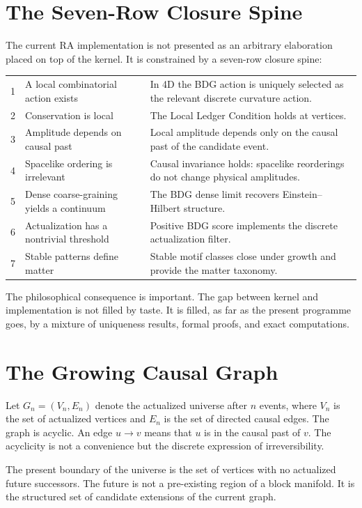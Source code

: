 \documentclass[11pt]{article}
\begin{document}
\section{The Seven-Row Closure Spine}
The current RA implementation is not presented as an arbitrary elaboration placed on top of the kernel. It is constrained by a seven-row closure spine:
\begin{center}
\begin{tabular}{p{} p{} p{}}
1 & A local combinatorial action exists & In 4D the BDG action is uniquely selected as the relevant discrete curvature action.\\
2 & Conservation is local & The Local Ledger Condition holds at vertices.\\
3 & Amplitude depends on causal past & Local amplitude depends only on the causal past of the candidate event.\\
4 & Spacelike ordering is irrelevant & Causal invariance holds: spacelike reorderings do not change physical amplitudes.\\
5 & Dense coarse-graining yields a continuum & The BDG dense limit recovers Einstein--Hilbert structure.\\
6 & Actualization has a nontrivial threshold & Positive BDG score implements the discrete actualization filter.\\
7 & Stable patterns define matter & Stable motif classes close under growth and provide the matter taxonomy.\\
\end{tabular}
\end{center}

The philosophical consequence is important. The gap between kernel and implementation is not filled by taste. It is filled, as far as the present programme goes, by a mixture of uniqueness results, formal proofs, and exact computations.

\section{The Growing Causal Graph}
Let $G_n=(V_n,E_n)$ denote the actualized universe after $n$ events, where $V_n$ is the set of actualized vertices and $E_n$ is the set of directed causal edges. The graph is acyclic. An edge $u\to v$ means that $u$ is in the causal past of $v$. The acyclicity is not a convenience but the discrete expression of irreversibility.

The present boundary of the universe is the set of vertices with no actualized future successors. The future is not a pre-existing region of a block manifold. It is the structured set of candidate extensions of the current graph.
\end{document}
